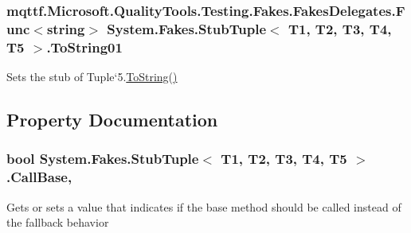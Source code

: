 \hypertarget{class_system_1_1_fakes_1_1_stub_tuple_3_01_t1_00_01_t2_00_01_t3_00_01_t4_00_01_t5_01_4_a831923e2bf4f586e518df4119566ffbf}{
\subsubsection[{To\-String01}]{\setlength{\rightskip}{0pt plus 5cm}mqttf.\-Microsoft.\-Quality\-Tools.\-Testing.\-Fakes.\-Fakes\-Delegates.\-Func$<$string$>$ System.\-Fakes.\-Stub\-Tuple$<$ T1, T2, T3, T4, T5 $>$.To\-String01}}\label{class_system_1_1_fakes_1_1_stub_tuple_3_01_t1_00_01_t2_00_01_t3_00_01_t4_00_01_t5_01_4_a831923e2bf4f586e518df4119566ffbf}


Sets the stub of Tuple`5.\hyperlink{class_system_1_1_fakes_1_1_stub_tuple_3_01_t1_00_01_t2_00_01_t3_00_01_t4_00_01_t5_01_4_a7409cdfc9619fcf7bb19cabde917332d}{To\-String()}



\subsection{Property Documentation}
\hypertarget{class_system_1_1_fakes_1_1_stub_tuple_3_01_t1_00_01_t2_00_01_t3_00_01_t4_00_01_t5_01_4_a8c7a3271369a6a2a8947155f3cfedd61}{
\subsubsection[{Call\-Base}]{\setlength{\rightskip}{0pt plus 5cm}bool System.\-Fakes.\-Stub\-Tuple$<$ T1, T2, T3, T4, T5 $>$.Call\-Base\hspace{0.3cm}{\ttfamily [get]}, {\ttfamily [set]}}}\label{class_system_1_1_fakes_1_1_stub_tuple_3_01_t1_00_01_t2_00_01_t3_00_01_t4_00_01_t5_01_4_a8c7a3271369a6a2a8947155f3cfedd61}


Gets or sets a value that indicates if the base method should be called instead of the fallback behavior

